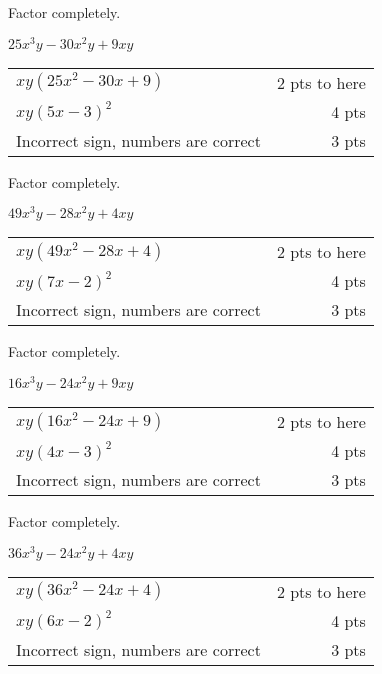 {
	Factor completely.\par
	$25x^3y-30x^2y+9xy$
}
{
	\begin{tabular}{l r}
	$xy(25x^2-30x+9)$ & 2 pts to here\\
	$xy(5x-3)^2$ & 4 pts\\
	Incorrect sign, numbers are correct &3 pts \\
	\end{tabular}
}

{
	Factor completely.\par
	$49x^3y-28x^2y+4xy$
}
{
	\begin{tabular}{l r}
	$xy(49x^2-28x+4)$ & 2 pts to here\\
	$xy(7x-2)^2$ & 4 pts\\
	Incorrect sign, numbers are correct & 3 pts
	\end{tabular}
}

{
	Factor completely.\par
	$16x^3y-24x^2y+9xy$
}
{
	\begin{tabular}{l r}
	$xy(16x^2-24x+9)$ & 2 pts to here\\
	$xy(4x-3)^2$ & 4 pts\\
	Incorrect sign, numbers are correct &3 pts
	\end{tabular}
}

{
	Factor completely.\par
	$36x^3y-24x^2y+4xy$
}
{
	\begin{tabular}{l r}
	$xy(36x^2-24x+4)$ & 2 pts to here\\
	$xy(6x-2)^2$ & 4 pts\\
	Incorrect sign, numbers are correct &3 pts
	\end{tabular}
}
